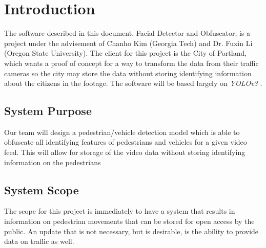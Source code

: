 \documentclass[onecolumn, draftclsnofoot,10pt, compsoc]{IEEEtran}
\begin{document}
\newpage
{}
\tableofcontents
\clearpage

\section{Introduction}
The software described in this document, Facial Detector and Obfuscator, is a project under the advisement of Chanho Kim (Georgia Tech) and Dr. Fuxin Li (Oregon State University). The client for this project is the City of Portland, which wants a proof of concept for a way to transform the data from their traffic cameras so the city may store the data without storing identifying information about the citizens in the footage. The software will be based largely on \textit{YOLOv3} \cite{YOLOv3}.
\subsection{System Purpose}
Our team will design a pedestrian/vehicle detection model which is able to obfuscate all identifying features of pedestrians and vehicles for a given video feed. This will allow for storage of the video data without storing identifying information on the pedestrians
\subsection{System Scope}
The scope for this project is immediately to have a system that results in information on pedestrian movements that can be stored for open access by the public. An update that is not necessary, but is desirable, is the ability to provide data on traffic as well.
\end{document}
